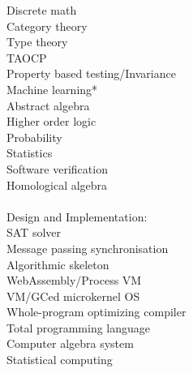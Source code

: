 \documentclass[leqno]{amsart}
\begin{document}
\noindent
Discrete math\\
Category theory\\
Type theory\\
TAOCP\\
Property based testing/Invariance\\
Machine learning*\\
Abstract algebra\\
Higher order logic\\
Probability\\
Statistics\\
Software verification\\
Homological algebra\\
\\
Design and Implementation:\\
SAT solver\\
Message passing synchronisation\\
Algorithmic skeleton\\
WebAssembly/Process VM\\
VM/GCed microkernel OS\\
Whole-program optimizing compiler\\
Total programming language\\
Computer algebra system\\
Statistical computing
\end{document}
